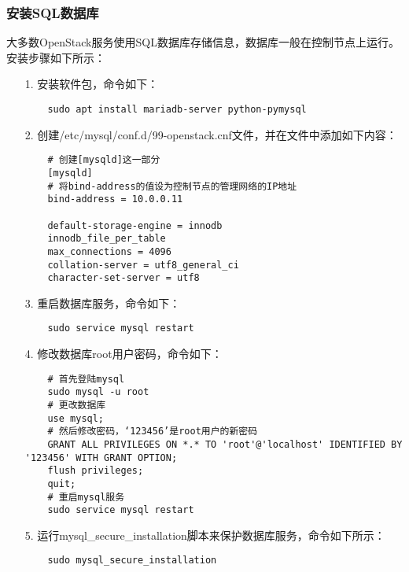 \documentclass[a4paper,left=2.5cm,right=2.5cm,11pt]{article}
\begin{document}
\subsubsection{安装SQL数据库}
	大多数OpenStack服务使用SQL数据库存储信息，数据库一般在控制节点上运行。
	安装步骤如下所示：
	\begin{itemize}
		\item[1.] 安装软件包，命令如下：
		\begin{lstlisting}
	sudo apt install mariadb-server python-pymysql
		\end{lstlisting}

		\item[2.] 创建/etc/mysql/conf.d/99-openstack.cnf文件，并在文件中添加如下内容：
		\begin{lstlisting}
	# 创建[mysqld]这一部分
	[mysqld]
	# 将bind-address的值设为控制节点的管理网络的IP地址
	bind-address = 10.0.0.11

	default-storage-engine = innodb
	innodb_file_per_table
	max_connections = 4096
	collation-server = utf8_general_ci
	character-set-server = utf8
		\end{lstlisting}

		\item[3.] 重启数据库服务，命令如下：
		\begin{lstlisting}
	sudo service mysql restart
		\end{lstlisting}

		\item[4.] 修改数据库root用户密码，命令如下：
		\begin{lstlisting}
	# 首先登陆mysql
	sudo mysql -u root
	# 更改数据库
	use mysql;
	# 然后修改密码，‘123456’是root用户的新密码
	GRANT ALL PRIVILEGES ON *.* TO 'root'@'localhost' IDENTIFIED BY '123456' WITH GRANT OPTION;
	flush privileges;
	quit;
	# 重启mysql服务
	sudo service mysql restart
		\end{lstlisting}

		\item[5.] 运行mysql\_secure\_installation脚本来保护数据库服务，命令如下所示：
		\begin{lstlisting}
	sudo mysql_secure_installation
		\end{lstlisting}
	\end{itemize}
\end{document}
